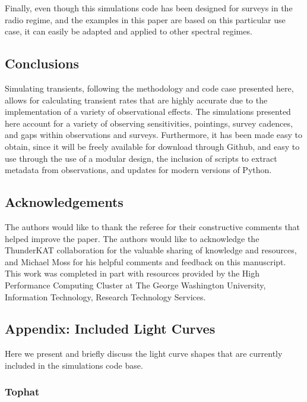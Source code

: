 \documentclass[12pt]{article}
\begin{document}
Finally, even though this simulations code has been designed for surveys in the radio regime, and the examples in this paper are based on this particular use case, it can easily be adapted and applied to other spectral regimes.


\subsection{Conclusions} \label{conclusions}
Simulating transients, following the methodology and code case presented here, allows for calculating transient rates that are highly accurate due to the implementation of a variety of observational effects. The simulations presented here account for a variety of observing sensitivities, pointings, survey cadences, and gaps within observations and surveys. Furthermore, it has been made easy to obtain, since it will be freely available for download through Github, and easy to use through the use of a modular design, the inclusion of scripts to extract metadata from observations, and updates for modern versions of Python.



\subsection{Acknowledgements} 

The authors would like to thank the referee for their constructive comments that helped improve the paper.
The authors would like to acknowledge the ThunderKAT collaboration for the valuable sharing of knowledge and resources, and Michael Moss for his helpful comments and feedback on this manuscript. 
This work was completed in part with resources provided by the High Performance Computing Cluster
at The George Washington University, Information Technology, Research Technology Services.

\subsection{Appendix: Included Light Curves}
\label{sec:lc:appendix}

Here we present and briefly discuss the light curve shapes that are currently included in the simulations code base.

\subsubsection{Tophat}
\end{document}
